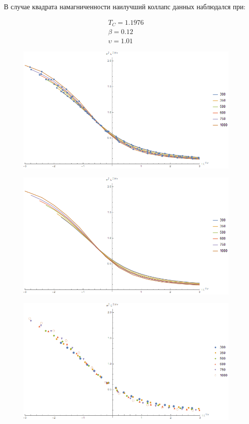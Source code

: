 В случае квадрата намагниченности наилучший коллапс данных наблюдался при:

\begin{align*}
    T_{C} = 1.1976 \\
    \beta = 0.12 \\
    \upsilon = 1.01
\end{align*}

\begin{figure}[!h]
    \centering
    \includegraphics[width=150mm]{Sections/Images/DatColMagn2_1.png}
    \label{fig:DatColM2_1}
\end{figure}

\begin{figure}[!h]
    \centering
    \includegraphics[width=150mm]{Sections/Images/DatColMagn2_2.png}
    \label{fig:DatColM2_2}
\end{figure}

\begin{figure}[!h]
    \centering
    \includegraphics[width=150mm]{Sections/Images/DatColMagn2_3.png}
    \label{fig:DatColM2_3}
\end{figure}

